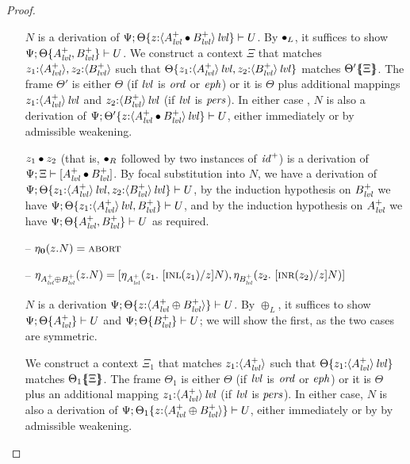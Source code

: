 \begin{proof}
\begin{itemize}
  $N$ is a derivation of 
  $\foc{\Psi}{\tackon{\Theta}
   {z{:}\islvl{\susp{A^+_\mlvl \fuse B^+_\mlvl}}}}{U}$. 
  By ${\fuse}_L$, it suffices to
  show $\foc{\Psi}{\tackon{\Theta}{A^+_\mlvl, B^+_\mlvl}}{U}$.
  We construct a context $\Xi$ that matches 
  $\matchconj{z_1{:}\susp{A^+_\mlvl}}{z_2{:}\susp{B^+_\mlvl}}$
  such that $\tackon{\Theta}
              {\mkconj{z_1{:}\islvl{\susp{A^+_\mlvl}}}
                      {z_2{:}\islvl{\susp{B^+_\mlvl}}}}$
  matches $\frameoff{\Theta'}{\Xi}$. The frame 
  $\Theta'$ is either $\Theta$ (if $\mlvl$ is $\mtrue$ or $\meph$) 
  or it is $\Theta$ plus additional mappings
  $z_1{:}\islvl{\susp{A^+_\mlvl}}$ and 
  $z_2{:}\islvl{\susp{B^+_\mlvl}}$ (if $\mlvl$ is $\mpers$). In either
  case , $N$ is also a derivation of 
  $\foc{\Psi}{\tackon{\Theta'}
   {z{:}\islvl{\susp{A^+_\mlvl \fuse B^+_\mlvl}}}}{U}$, either
  immediately or by admissible weakening.
  \smallskip


  $\tfuser{z_1}{z_2}$ (that is, ${\fuse}_R$ followed by two instances of 
  ${\it id}^+$) is a derivation of 
  $\foc{\Psi}{\Xi}{[A^+_\mlvl \fuse B^+_\mlvl]}$.
  By focal substitution into $N$, we have
  a derivation of 
  $\foc{\Psi}{\tackon{\Theta}
              {\mkconj{z_1{:}\islvl{\susp{A^+_\mlvl}}}
                      {z_2{:}\islvl{\susp{B^+_\mlvl}}}}}{U}$,
  by the induction hypothesis on $B^+_\mlvl$ we have
  $\foc{\Psi}{\tackon{\Theta}
              {\mkconj{z_1{:}\islvl{\susp{A^+_\mlvl}}}
                      {B^+_\mlvl}}}{U}$, and by
  the induction hypothesis on $A^+_\mlvl$ we have
   $\foc{\Psi}{\tackon{\Theta}
              {\mkconj{A^+_\mlvl}
                      {B^+_\mlvl}}}{U}$ as required.
  \smallskip
 

\item[--] $\etapa{z}{N}{\zero} = \tabort$ 

\item[--] $\etapa{z}{N}{A^+_\mlvl \oplus B^+_\mlvl} = 
           \toplusl
            {\etapa{z_1}{~[\tinl{z_1}/z]N}{A^+_\mlvl}}
            {\etapa{z_2}{~[\tinr{z_2}/z]N}{B^+_\mlvl}}$
\smallskip

$N$ is a derivation 
$\foc{\Psi}{\tackon{\Theta}{z{:}\susp{A^+_\mlvl \oplus B^+_\mlvl}}}{U}$.
By $\oplus_L$, it suffices to show 
$\foc{\Psi}{\tackon{\Theta}{A^+_\mlvl}}{U}$
and
$\foc{\Psi}{\tackon{\Theta}{B^+_\mlvl}}{U}$; we will show the first, as the
two cases are symmetric. 
\smallskip

We construct a context $\Xi_1$ that matches $z_1{:}\susp{A^+_\mlvl}$
such that $\tackon{\Theta}{z_1{:}\islvl{\susp{A^+_\mlvl}}}$ matches
$\frameoff{\Theta_1}{\Xi}$. The frame $\Theta_1$ is either 
$\Theta$ (if $\mlvl$ is $\mtrue$ or $\meph$) or it is $\Theta$
plus an additional mapping $z_1{:}\islvl{\susp{A^+_\mlvl}}$ (if
$\mlvl$ is $\mpers$). In either case, $N$ is also a derivation
of $\foc{\Psi}{\tackon{\Theta_1}{z{:}\susp{A^+_\mlvl \oplus B^+_\mlvl}}}{U}$,
either immediately or by by admissible weakening.
\smallskip


\end{itemize}
\end{proof}
